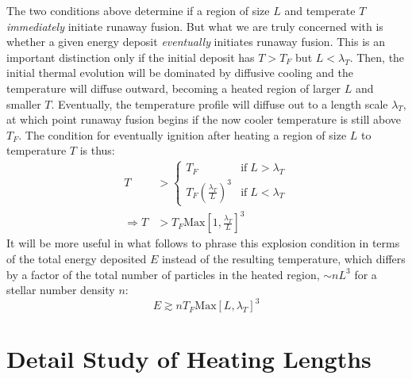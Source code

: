 \documentclass[11 pt,preprint,preprintnumbers,amsmath,amssymb, prd]{revtex4}
\begin{document}
\begin{appendices}
The two conditions above determine if a region of size $L$ and temperate $T$ \emph{immediately} initiate runaway fusion.  But what we are truly concerned with is whether a given energy deposit \emph{eventually} initiates runaway fusion.  This is an important distinction only if the initial deposit has $T > T_F$ but $L<\lambda_T$.  Then, the initial thermal evolution will be dominated by diffusive cooling and the temperature will diffuse outward, becoming a heated region of larger $L$ and smaller $T$.  Eventually, the temperature profile will diffuse out to a length scale $\lambda_T$, at which point runaway fusion begins if the now cooler temperature is still above $T_F$.  The condition for eventually ignition after heating a region of size $L$ to temperature $T$ is thus:
\begin{align*}
    T &> 
    \begin{cases}
    T_F &\text{if}\; L > \lambda_T \\
    T_F \left( \frac{\lambda_T}{L} \right)^3 &\text{if}\; L < \lambda_T
    \end{cases} \\
    \Rightarrow T &> T_F \text{Max}\left[1, \frac{\lambda_T}{L}\right]^3
\end{align*}
It will be more useful in what follows to phrase this explosion condition in terms of the total energy deposited $E$ instead of the resulting temperature, which differs by a factor of the total number of particles in the heated region, $\sim nL^3$ for a stellar number density $n$:
\[
    E \gtrsim n T_F \text{Max}\left[L, \lambda_T\right]^3
\]

\section{Detail Study of Heating Lengths}
\label{app:heatinglengthfull}

\end{appendices}


\end{document}
